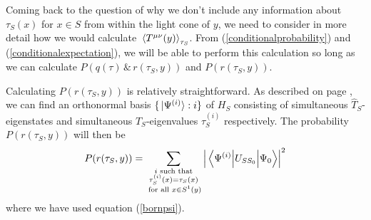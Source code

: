  Coming back to the question of why we don't include any information about $\tau_S(x)$ for $x\in S$ from within the light cone of $y$, we need to consider in more detail how we would calculate $\ev*{T^{\mu\nu}(y)}_{\tau_S}$. From (\ref{conditionalprobability}) and (\ref{conditionalexpectation}), we will be able to perform this calculation so long as we can calculate $P(q(\tau) \, \&\,  r(\tau_S,y))$ and $P(r(\tau_S,y))$. 
 
 Calculating $P(r(\tau_S,y))$ is relatively straightforward. As described on page \pageref{simultaneous}, we can find an orthonormal basis $\{\ket*{\Psi^{(i)}}:i\}$ of $H_S$ consisting of simultaneous $\hat{T}_S$-eigenstates and simultaneous $\hat{T}_S$-eigenvalues $\tau^{(i)}_S$ respectively. The probability $P(r(\tau_S,y))$ will then be  
 \begin{equation}\label{rProb}
 P(r(\tau_S,y))=\sum_{\substack{i \text{ such that} \\ \tau_S^{(i)}(x)=\tau_S(x)\\ \text{ for all }x\in S^1(y)}}\abs{\mel{\Psi^{(i)}}{U_{SS_0}}{\Psi_0}}^2
 \end{equation} where we have used equation (\ref{bornpsi}).

